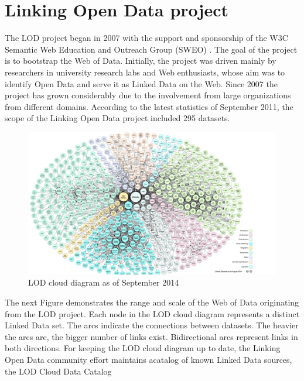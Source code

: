 \documentclass[a4paper,12pt,oneside]{report}
\begin{document}
{{{\section{Linking Open Data project}
{The LOD project began in 2007 with the support and sponsorship of the W3C Semantic Web Education and Outreach Group (SWEO) . The goal of the project is to bootstrap the Web of Data. Initially, the project was driven mainly by researchers
in university research labs and Web enthusiasts, whose aim was to identify Open Data and serve it as Linked Data on the Web. Since 2007 the project has grown considerably due to the involvement from large organizations from different domains. According to the latest statistics of September 2011, the scope of the Linking Open Data project included 295 datasets.\\
\begin{figure}[h!]
\centering
\includegraphics[width=1\textwidth]{Capture6}
\caption{LOD cloud diagram as of September 2014}
\end{figure}
The next Figure demonstrates the range and scale of the Web of Data originating from the LOD project.
Each node in the LOD cloud diagram represents a distinct Linked Data set. The arcs indicate the connections between datasets. The heavier the arcs are, the bigger number of links exist. Bidirectional arcs represent links in both directions. For keeping the
LOD cloud diagram up to date, the Linking Open Data community effort maintains acatalog of known Linked Data sources, the LOD Cloud Data Catalog }
}}}
\end{document}
